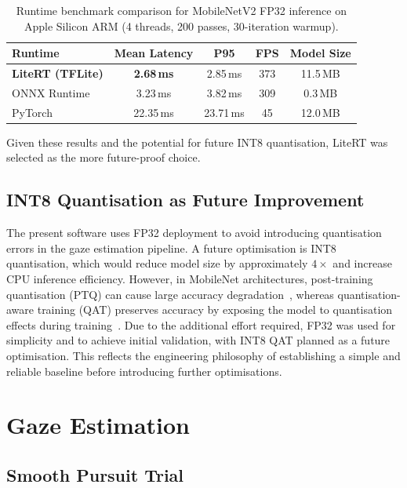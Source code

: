 \begin{table}[htbp]
    \centering
    \caption{Runtime benchmark comparison for MobileNetV2 FP32 inference on Apple Silicon ARM (4 threads, 200 passes, 30-iteration warmup).}
    \label{tab:runtime-benchmark}
    \begin{tabular}{lcccc}
        \toprule
        \textbf{Runtime} & \textbf{Mean Latency} & \textbf{P95} & \textbf{FPS} & \textbf{Model Size} \\
        \midrule
        \textbf{LiteRT (TFLite)} & \textbf{2.68\,ms} & 2.85\,ms & 373 & 11.5\,MB \\
        ONNX Runtime             & 3.23\,ms           & 3.82\,ms & 309 & 0.3\,MB \\
        PyTorch                  & 22.35\,ms          & 23.71\,ms & 45 & 12.0\,MB \\
        \bottomrule
    \end{tabular}
\end{table}

Given these results and the potential for future INT8 quantisation, LiteRT was selected as the more future-proof choice.

\subsection{INT8 Quantisation as Future Improvement}
\label{sec:int8}

The present software uses FP32 deployment to avoid introducing quantisation errors in the gaze estimation pipeline. A future optimisation is INT8 quantisation, which would reduce model size by approximately $4\times$ and increase CPU inference efficiency. However, in MobileNet architectures, post-training quantisation (PTQ) can cause large accuracy degradation~\cite{yun2021mobilenets}, whereas quantisation-aware training (QAT) preserves accuracy by exposing the model to quantisation effects during training~\cite{google_qat}. Due to the additional effort required, FP32 was used for simplicity and to achieve initial validation, with INT8 QAT planned as a future optimisation. This reflects the engineering philosophy of establishing a simple and reliable baseline before introducing further optimisations.


\section{Gaze Estimation}
\label{sec:gaze-estimation}

\subsection{Smooth Pursuit Trial}

